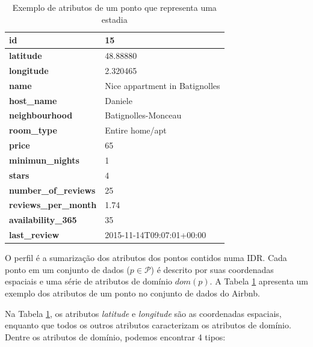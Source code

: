 \begin{table}[]
	\centering
	\begin{tabular}{|l|l|}
		\hline
		\textbf{id}                  & 15                             \\ \hline
		\textbf{latitude}            & 48.88880                       \\ \hline
		\textbf{longitude}           & 2.320465                       \\ \hline
		\textbf{name}                & Nice appartment in Batignolles \\ \hline
		\textbf{host\_name}          & Daniele                        \\ \hline
		\textbf{neighbourhood}       & Batignolles-Monceau            \\ \hline
		\textbf{room\_type}          & Entire home/apt                \\ \hline
		\textbf{price}               & 65                             \\ \hline
		\textbf{minimun\_nights}     & 1                              \\ \hline
		\textbf{stars}               & 4                              \\ \hline
		\textbf{number\_of\_reviews} & 25                             \\ \hline
		\textbf{reviews\_per\_month} & 1.74                           \\ \hline
		\textbf{availability\_365}   & 35                             \\ \hline
		\textbf{last\_review}        & 2015-11-14T09:07:01+00:00      \\ \hline
	\end{tabular}
	\caption{Exemplo de atributos de um ponto que representa uma estadia}
	\label{table:atributos}
\end{table}

O perfil é a sumarização dos atributos dos pontos contidos numa IDR. Cada ponto em um conjunto de dados ($p \in \mathcal{P}$) é descrito por suas coordenadas espaciais e uma série de atributos de domínio $dom(p)$. A Tabela \ref{table:atributos} apresenta um exemplo dos atributos de um ponto no conjunto de dados do Airbnb.

Na Tabela \ref{table:atributos}, os atributos {\em latitude} e {\em longitude} são as coordenadas espaciais, enquanto que todos os outros atributos caracterizam os atributos de domínio. Dentre os atributos de domínio, podemos encontrar 4 tipos:

